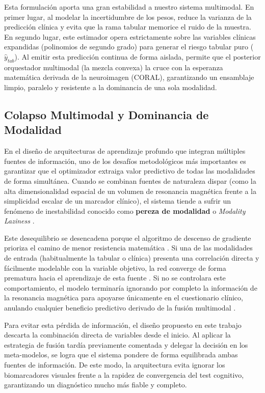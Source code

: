 \documentclass[12pt, oneside, english, spanish]{book}
\begin{document}
Esta formulación aporta una gran estabilidad a nuestro sistema multimodal. En primer lugar, al modelar la incertidumbre de los pesos, reduce la varianza de la predicción clínica y evita que la rama tabular memorice el ruido de la muestra. En segundo lugar, este estimador opera estrictamente sobre las variables clínicas expandidas (polinomios de segundo grado) para generar el riesgo tabular puro ($\hat{y}_{tab}$). Al emitir esta predicción continua de forma aislada, permite que el posterior orquestador multimodal (la mezcla convexa) la cruce con la esperanza matemática derivada de la neuroimagen (CORAL), garantizando un ensamblaje limpio, paralelo y resistente a la dominancia de una sola modalidad.

\subsection{Colapso Multimodal y Dominancia de Modalidad} \label{subsec:sota_colapso_multimodal}

En el diseño de arquitecturas de aprendizaje profundo que integran múltiples fuentes de información, uno de los desafíos metodológicos más importantes es garantizar que el optimizador extraiga valor predictivo de todas las modalidades de forma simultánea. Cuando se combinan fuentes de naturaleza dispar (como la alta dimensionalidad espacial de un volumen de resonancia magnética frente a la simplicidad escalar de un marcador clínico), el sistema tiende a sufrir un fenómeno de inestabilidad conocido como \textbf{pereza de modalidad} o \textit{Modality Laziness} \cite{javaloy2022, wang2020makes}.

Este desequilibrio se desencadena porque el algoritmo de descenso de gradiente prioriza el camino de menor resistencia matemática \cite{wang2020makes}. Si una de las modalidades de entrada (habitualmente la tabular o clínica) presenta una correlación directa y fácilmente modelable con la variable objetivo, la red converge de forma prematura hacia el aprendizaje de esta fuente \cite{javaloy2022}. Si no se controlara este comportamiento, el modelo terminaría ignorando por completo la información de la resonancia magnética para apoyarse únicamente en el cuestionario clínico, anulando cualquier beneficio predictivo derivado de la fusión multimodal \cite{javaloy2022}.

Para evitar esta pérdida de información, el diseño propuesto en este trabajo descarta la combinación directa de variables desde el inicio. Al aplicar la estrategia de fusión tardía previamente comentada y delegar la decisión en los meta-modelos, se logra que el sistema pondere de forma equilibrada ambas fuentes de información. De este modo, la arquitectura evita ignorar los biomarcadores visuales frente a la rapidez de convergencia del test cognitivo, garantizando un diagnóstico mucho más fiable y completo.
\end{document}
